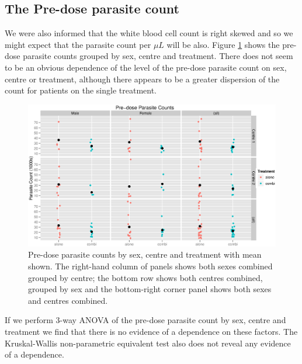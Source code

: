 \subsection{The Pre-dose parasite count}
We were also informed that the white blood cell count is right skewed and so we might expect that the parasite count per $\mu L$ will be also.
Figure \ref{preaov} shows the pre-dose parasite counts grouped by sex, centre and treatment. There does not seem to be an obvious dependence of the level of the pre-dose parasite count on sex, centre or treatment, although there appears to be a greater dispersion of the count for patients on the single treatment.
\begin{figure}[h]
\begin{center}
\includegraphics[width=150mm]{preaov.eps}
\caption{Pre-dose parasite counts by sex, centre and treatment with mean shown. The right-hand column of panels shows both sexes combined grouped by centre; the bottom row shows both centres combined, grouped by sex and the bottom-right corner panel shows both sexes and centres combined.}
\label{preaov}
\end{center}
\end{figure}

If we perform 3-way ANOVA of the pre-dose parasite count by sex, centre and treatment we find that there is no evidence of a dependence on these factors. The Kruskal-Wallis non-parametric equivalent test also does not reveal any evidence of a dependence.

